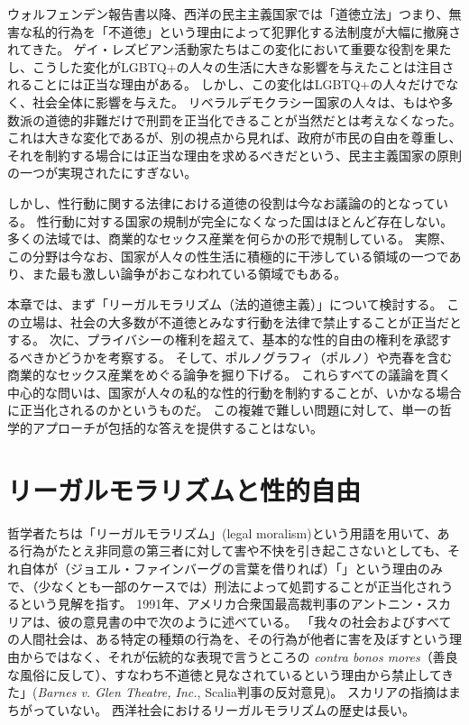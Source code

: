 \documentclass[paper=a4,book,openany]{jlreq} \usepackage{mystyle}
\begin{document}
ウォルフェンデン報告書以降、西洋の民主主義国家では「道徳立法」{\DDASH}つまり、無害な私的行為を「不道徳」という理由によって犯罪化する法制度{\DDASH}が大幅に撤廃されてきた。
ゲイ・レズビアン活動家たちはこの変化において重要な役割を果たし、こうした変化がLGBTQ+の人々の生活に大きな影響を与えたことは注目されることには正当な理由がある。
しかし、この変化はLGBTQ+の人々だけでなく、社会全体に影響を与えた。
リベラルデモクラシー国家の人々は、もはや多数派の道徳的非難だけで刑罰を正当化できることが当然だとは考えなくなった。
これは大きな変化であるが、別の視点から見れば、政府が市民の自由を尊重し、それを制約する場合には正当な理由を求めるべきだという、民主主義国家の原則の一つが実現されたにすぎない。

しかし、性行動に関する法律における道徳の役割は今なお議論の的となっている。
性行動に対する国家の規制が完全になくなった国はほとんど存在しない。
多くの法域では、商業的なセックス産業を何らかの形で規制している。
実際、この分野は今なお、国家が人々の性生活に積極的に干渉している領域の一つであり、また最も激しい論争がおこなわれている領域でもある。

本章では、まず「リーガルモラリズム（法的道徳主義）」について検討する。
この立場は、社会の大多数が不道徳とみなす行動を法律で禁止することが正当だとする。
次に、プライバシーの権利を超えて、基本的な性的自由の権利を承認するべきかどうかを考察する。
そして、ポルノグラフィ（ポルノ）や売春を含む商業的なセックス産業をめぐる論争を掘り下げる。
これらすべての議論を貫く中心的な問いは、国家が人々の私的な性的行動を制約することが、いかなる場合に正当化されるのかというものだ。
この複雑で難しい問題に対して、単一の哲学的アプローチが包括的な答えを提供することはない。

\section{リーガルモラリズムと性的自由}

哲学者たちは「リーガルモラリズム」(legal moralism)という用語を用いて、ある行為がたとえ非同意の第三者に対して害や不快を引き起こさないとしても、それ自体が（ジョエル・ファインバーグの言葉を借りれば）「」という理由のみで、（少なくとも一部のケースでは）刑法によって処罰することが正当化されうるという見解を指す\citep[p.249]{feinberg87:_some_unswep_debris_hart_devlin_debat}。
1991年、アメリカ合衆国最高裁判事のアントニン・スカリアは、彼の意見書の中で次のように述べている。
「我々の社会およびすべての人間社会は、ある特定の種類の行為を、その行為が他者に害を及ぼすという理由からではなく、それが伝統的な表現で言うところの \emph{contra bonos mores}（善良な風俗に反して）、すなわち不道徳と見なされているという理由から禁止してきた」(\emph{Barnes v. Glen Theatre, Inc.}, Scalia判事の反対意見)。
スカリアの指摘はまちがっていない。
西洋社会におけるリーガルモラリズムの歴史は長い。
\end{document}
